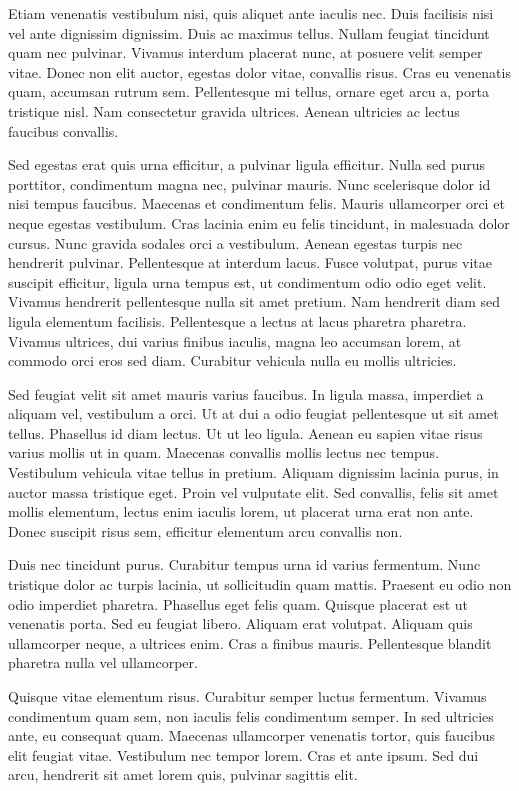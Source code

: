 \documentclass[12pt, a4paper]{article}
\begin{document}
Etiam venenatis vestibulum nisi, quis aliquet ante iaculis nec. Duis facilisis nisi vel ante dignissim dignissim. Duis ac maximus tellus. Nullam feugiat tincidunt quam nec pulvinar. Vivamus interdum placerat nunc, at posuere velit semper vitae. Donec non elit auctor, egestas dolor vitae, convallis risus. Cras eu venenatis quam, accumsan rutrum sem. Pellentesque mi tellus, ornare eget arcu a, porta tristique nisl. Nam consectetur gravida ultrices. Aenean ultricies ac lectus faucibus convallis.

Sed egestas erat quis urna efficitur, a pulvinar ligula efficitur. Nulla sed purus porttitor, condimentum magna nec, pulvinar mauris. Nunc scelerisque dolor id nisi tempus faucibus. Maecenas et condimentum felis. Mauris ullamcorper orci et neque egestas vestibulum. Cras lacinia enim eu felis tincidunt, in malesuada dolor cursus. Nunc gravida sodales orci a vestibulum. Aenean egestas turpis nec hendrerit pulvinar. Pellentesque at interdum lacus. Fusce volutpat, purus vitae suscipit efficitur, ligula urna tempus est, ut condimentum odio odio eget velit. Vivamus hendrerit pellentesque nulla sit amet pretium. Nam hendrerit diam sed ligula elementum facilisis. Pellentesque a lectus at lacus pharetra pharetra. Vivamus ultrices, dui varius finibus iaculis, magna leo accumsan lorem, at commodo orci eros sed diam. Curabitur vehicula nulla eu mollis ultricies.

Sed feugiat velit sit amet mauris varius faucibus. In ligula massa, imperdiet a aliquam vel, vestibulum a orci. Ut at dui a odio feugiat pellentesque ut sit amet tellus. Phasellus id diam lectus. Ut ut leo ligula. Aenean eu sapien vitae risus varius mollis ut in quam. Maecenas convallis mollis lectus nec tempus. Vestibulum vehicula vitae tellus in pretium. Aliquam dignissim lacinia purus, in auctor massa tristique eget. Proin vel vulputate elit. Sed convallis, felis sit amet mollis elementum, lectus enim iaculis lorem, ut placerat urna erat non ante. Donec suscipit risus sem, efficitur elementum arcu convallis non.

Duis nec tincidunt purus. Curabitur tempus urna id varius fermentum. Nunc tristique dolor ac turpis lacinia, ut sollicitudin quam mattis. Praesent eu odio non odio imperdiet pharetra. Phasellus eget felis quam. Quisque placerat est ut venenatis porta. Sed eu feugiat libero. Aliquam erat volutpat. Aliquam quis ullamcorper neque, a ultrices enim. Cras a finibus mauris. Pellentesque blandit pharetra nulla vel ullamcorper.

Quisque vitae elementum risus. Curabitur semper luctus fermentum. Vivamus condimentum quam sem, non iaculis felis condimentum semper. In sed ultricies ante, eu consequat quam. Maecenas ullamcorper venenatis tortor, quis faucibus elit feugiat vitae. Vestibulum nec tempor lorem. Cras et ante ipsum. Sed dui arcu, hendrerit sit amet lorem quis, pulvinar sagittis elit.
\end{document}
